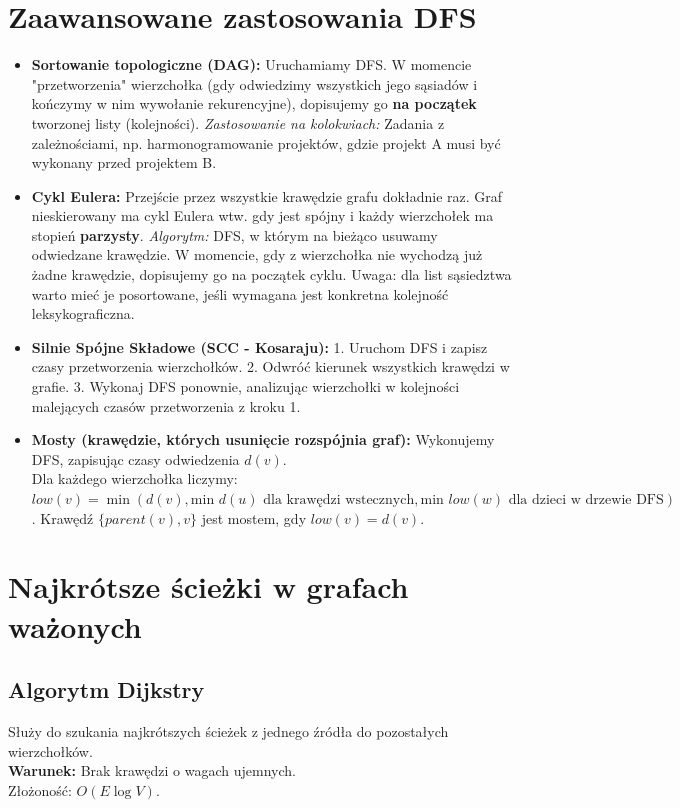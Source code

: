 \documentclass[12pt, a4paper]{article}
\begin{document}
\section{Zaawansowane zastosowania DFS}
\begin{itemize}
    \item \textbf{Sortowanie topologiczne (DAG):} Uruchamiamy DFS. W momencie "przetworzenia" wierzchołka (gdy odwiedzimy wszystkich jego sąsiadów i kończymy w nim wywołanie rekurencyjne), dopisujemy go \textbf{na początek} tworzonej listy (kolejności). 
    \textit{Zastosowanie na kolokwiach:} Zadania z zależnościami, np. harmonogramowanie projektów, gdzie projekt A musi być wykonany przed projektem B.
    
    \item \textbf{Cykl Eulera:} Przejście przez wszystkie krawędzie grafu dokładnie raz. Graf nieskierowany ma cykl Eulera wtw. gdy jest spójny i każdy wierzchołek ma stopień \textbf{parzysty}. 
    \textit{Algorytm:} DFS, w którym na bieżąco usuwamy odwiedzane krawędzie. W momencie, gdy z wierzchołka nie wychodzą już żadne krawędzie, dopisujemy go na początek cyklu. Uwaga: dla list sąsiedztwa warto mieć je posortowane, jeśli wymagana jest konkretna kolejność leksykograficzna.
    
    \item \textbf{Silnie Spójne Składowe (SCC - Kosaraju):} 
    1. Uruchom DFS i zapisz czasy przetworzenia wierzchołków. 
    2. Odwróć kierunek wszystkich krawędzi w grafie. 
    3. Wykonaj DFS ponownie, analizując wierzchołki w kolejności malejących czasów przetworzenia z kroku 1.
    
    \item \textbf{Mosty (krawędzie, których usunięcie rozspójnia graf):} 
    Wykonujemy DFS, zapisując czasy odwiedzenia $d(v)$. \\
    Dla każdego wierzchołka liczymy: \\
    $low(v) = \min(d(v), \text{min } d(u) \text{ dla krawędzi wstecznych}, \text{min } low(w) \text{ dla dzieci w drzewie DFS})$. Krawędź $\{parent(v), v\}$ jest mostem, gdy $low(v) = d(v)$.
\end{itemize}

\section{Najkrótsze ścieżki w grafach ważonych}
\subsection{Algorytm Dijkstry}
Służy do szukania najkrótszych ścieżek z jednego źródła do pozostałych wierzchołków. \\ \textbf{Warunek:} Brak krawędzi o wagach ujemnych. \\ Złożoność: $O(E \log V)$.
\end{document}
